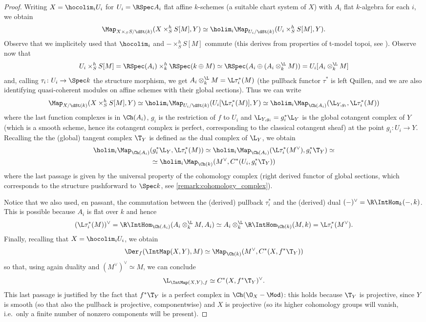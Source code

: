 \begin{proof}
            Writing $X = \hocolim_i U_i$ for $U_i = \RSpec A_i$ flat affine $k$-schemes (a suitable chart system of $X$) with $A_i$ flat $k$-algebra for each $i$, we obtain \[\Map_{X \times_S S/\dSt(k)}(X \times^h_S S[M], Y) \simeq \holim_i \Map_{U_i/\dSt(k)}(U_i \times_S^h S[M], Y). \] Observe that we implicitely used that $\hocolim_i$ and $- \times_S^h S[M]$ commute (this derives from properties of t-model topoi, see \cite[Theorem~4.9.2]{ToVe:hag1}).
            Observe now that \[U_i \times^h_S S[M] = \RSpec(A_i) \times_k^h \RSpec(k \oplus M) \simeq \RSpec(A_i \oplus (A_i \otimes_k^{\L} M)) = U_i[A_i \otimes_k^{\L} M] \] and, calling $\tau_i\colon U_i \to \Spec k$ the structure morphism, we get $A_i \otimes_k^{\L} M = \L\tau_i^*(M)$ (the pullback functor $\tau^*$ is left Quillen, and we are also identifying quasi-coherent modules on affine schemes with their global sections). 
            Thus we can write \[\Map_{X/\dSt(k)}(X \times^h_S S[M], Y) \simeq \holim_i \Map_{U_i/\dSt(k)}(U_i[\L\tau_i^*(M)], Y) \simeq \holim_i \Map_{\Ch(A_i)}(\L_{Y, g_i}, \L\tau_i^*(M)) \] where the last function complexes is in $\Ch(A_i)$, $g_i$ is the restriction of $f$ to $U_i$ and $\L_{Y, g_i} = g_i^*\L_Y$ is the global cotangent complex of $Y$ (which is a smooth scheme, hence its cotangent complex is perfect, corresponding to the classical cotangent sheaf) at the point $g_i\colon U_i \to Y$. Recalling the the (global) tangent complex $\T_Y$ is defined as the dual complex of $\L_Y$, we obtain 
            \begin{gather*}
                \holim_i \Map_{\Ch(A_i)}(g_i^*\L_Y, \L\tau_i^*(M)) \simeq \holim_i \Map_{\Ch(A_i)}(\L\tau_i^*(M^{\vee}), g_i^*\T_Y) \simeq \\
                \simeq \holim_i \Map_{\Ch(k)}(M^{\vee}, C^*(U_i, g_i^*\T_Y)) 
            \end{gather*}
            where the last passage is given by the universal property of the cohomology complex (right derived functor of global sections, which corresponds to the structure pushforward to $\Spec k$, see \cref{remark:cohomology_complex}).
            
            Notice that we also used, en passant, the commutation between the (derived) pullback $\tau_i^*$ and the (derived) dual $(-)^{\vee} = \R\IntHom_k(-, k)$. This is possible because $A_i$ is flat over $k$ and hence \[(\L\tau_i^*(M))^{\vee} = \R\IntHom_{\Ch(A_i)}(A_i \otimes_k^{\L} M, A_i) \simeq A_i \otimes_k^{\L} \R\IntHom_{\Ch(k)}(M, k) = \L\tau_i^*(M^{\vee}). \]
            Finally, recalling that $X = \hocolim_i U_i$, we obtain \[\Der_f(\IntMap(X, Y), M) \simeq \Map_{\Ch(k)}(M^{\vee}, C^*(X, f^*\T_Y)) \] so that, using again duality and $(M^{\vee})^{\vee} \simeq M$, we can conclude \[\L_{\IntMap(X, Y), f} \simeq C^*(X, f^*\T_Y)^{\vee}. \] This last passage is justified by the fact that $f^*\T_Y$ is a perfect complex in $\Ch(\O_X-\Mod)$: this holds because $\T_Y$ is projective, since $Y$ is smooth (so that also the pullback is projective, componentwise) and $X$ is projective (so its higher cohomology groups will vanish, i.e.\ only a finite number of nonzero components will be present).
        \end{proof}
